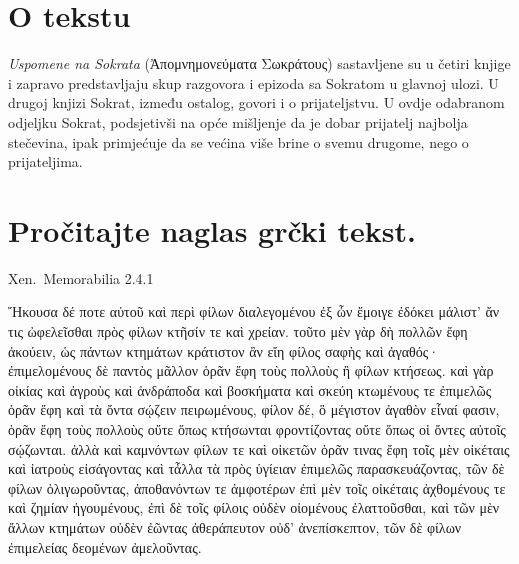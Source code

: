 


\section*{O tekstu}

\textit{Uspomene na Sokrata} \textgreek[variant=ancient]{(Ἀπομνημονεύματα Σωκράτους)} sastavljene su u četiri knjige i zapravo predstavljaju skup razgovora i epizoda sa Sokratom u glavnoj ulozi. U drugoj knjizi Sokrat, između ostalog, govori i o prijateljstvu. U ovdje odabranom odjeljku Sokrat, podsjetivši na opće mišljenje da je dobar prijatelj najbolja stečevina, ipak primjećuje da se većina više brine o svemu drugome, nego o prijateljima.


\section*{Pročitajte naglas grčki tekst.}


Xen.\ Memorabilia 2.4.1

\medskip

{\large
\begin{greek}
\noindent  Ἤκουσα δέ ποτε αὐτοῦ καὶ περὶ φίλων διαλεγομένου ἐξ ὧν ἔμοιγε ἐδόκει μάλιστ' ἄν τις ὠφελεῖσθαι πρὸς φίλων κτῆσίν τε καὶ χρείαν. τοῦτο μὲν γὰρ δὴ πολλῶν ἔφη ἀκούειν, ὡς πάντων κτημάτων κράτιστον ἂν εἴη φίλος σαφὴς καὶ ἀγαθός· ἐπιμελομένους δὲ παντὸς μᾶλλον ὁρᾶν ἔφη τοὺς πολλοὺς ἢ φίλων κτήσεως. καὶ γὰρ οἰκίας καὶ ἀγροὺς καὶ ἀνδράποδα καὶ βοσκήματα καὶ σκεύη κτωμένους τε ἐπιμελῶς ὁρᾶν ἔφη καὶ τὰ ὄντα σῴζειν πειρωμένους, φίλον δέ, ὃ μέγιστον ἀγαθὸν εἶναί φασιν, ὁρᾶν ἔφη τοὺς πολλοὺς οὔτε ὅπως κτήσωνται φροντίζοντας οὔτε ὅπως οἱ ὄντες αὐτοῖς σῴζωνται. ἀλλὰ καὶ καμνόντων φίλων τε καὶ οἰκετῶν ὁρᾶν τινας ἔφη τοῖς μὲν οἰκέταις καὶ ἰατροὺς εἰσάγοντας καὶ τἆλλα τὰ πρὸς ὑγίειαν ἐπιμελῶς παρασκευάζοντας, τῶν δὲ φίλων ὀλιγωροῦντας, ἀποθανόντων τε ἀμφοτέρων ἐπὶ μὲν τοῖς οἰκέταις ἀχθομένους τε καὶ ζημίαν ἡγουμένους, ἐπὶ δὲ τοῖς φίλοις οὐδὲν οἰομένους ἐλαττοῦσθαι, καὶ τῶν μὲν ἄλλων κτημάτων οὐδὲν ἐῶντας ἀθεράπευτον οὐδ' ἀνεπίσκεπτον, τῶν δὲ φίλων ἐπιμελείας δεομένων ἀμελοῦντας.
\end{greek}

}

